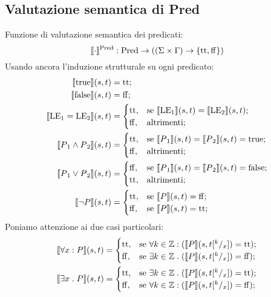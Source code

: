 \subsection{Valutazione semantica di Pred}
Funzione di valutazione semantica dei predicati:
$$\llbracket \cdot \rrbracket ^{\mathrm{Pred}}: \mathrm{Pred} \rightarrow ((\Sigma \times \Gamma) \rightarrow \{\mathrm{tt},\mathrm{ff} \})$$
Usando ancora l'induzione strutturale su ogni predicato:
\begin{align*}
   \llbracket \mathrm{true} \rrbracket(s,t) 
      &= \mathrm{tt};\\
   \llbracket \mathrm{false} \rrbracket(s,t) 
      &= \mathrm{ff};\\
   \llbracket \mathrm{LE}{_1} = \mathrm{LE}{_2}\rrbracket(s,t) 
      &=
        \begin{cases}
                \mathrm{tt}, &\text{se $\llbracket\mathrm{LE}{_1}\rrbracket(s,t) = \llbracket \mathrm{LE}{_2} \rrbracket(s,t)$};\\
                \mathrm{ff}, &\text{altrimenti};
        \end{cases}\\
    \llbracket P{_1} \wedge P{_2}\rrbracket(s,t) 
      &=
        \begin{cases}
                \mathrm{tt}, &\text{se $\llbracket P{_1}\rrbracket(s,t) = \llbracket P{_2}\rrbracket(s,t) = \mathrm{true}$};\\
                \mathrm{ff}, &\text{altrimenti};
        \end{cases}\\
    \llbracket P{_1} \vee P{_2}\rrbracket(s,t) 
      &=
        \begin{cases}
                \mathrm{ff}, &\text{se $\llbracket P{_1}\rrbracket(s,t) = \llbracket P{_2}\rrbracket(s,t) = \mathrm{false}$};   \\
                \mathrm{tt}, &\text{altrimenti};
        \end{cases} \\
    \llbracket \neg P\rrbracket(s,t) 
       &=
        \begin{cases}
                \mathrm{tt},&\text{se $\llbracket P\rrbracket(s,t) = \mathrm{ff}$};\\
                \mathrm{ff},&\text{se $\llbracket P\rrbracket(s,t) = \mathrm{tt}$};
        \end{cases}
\end{align*}
Poniamo attenzione ai due casi particolari:
\begin{align*}
   \llbracket\forall x \mathrel{:} P\rrbracket(s,t) 
      &=
        \begin{cases}
                \mathrm{tt}, &\text{se $\forall k\in\mathbb{Z}\mathrel{:}(\llbracket P\rrbracket(s,t[^k/_x]) = \mathrm{tt}$});\\
                \mathrm{ff}, &\text{se $\exists k\in\mathbb{Z}\mathrel{.}(\llbracket P\rrbracket(s,t[^k/_x]) = \mathrm{ff}$});
        \end{cases}\\
   \llbracket \exists x \mathrel{.} P\rrbracket(s,t) 
      &=
        \begin{cases}
                \mathrm{tt},  &\text{se $\exists k\in \mathbb{Z}\mathrel{.}(\llbracket P\rrbracket(s,t[^ k/_x]) = \mathrm{tt}$});\\
                \mathrm{ff},  &\text{se $\forall k\in \mathbb{Z}\mathrel{:}(\llbracket P\rrbracket(s,t[^k/_x]) = \mathrm{ff}$});
        \end{cases}
\end{align*}
